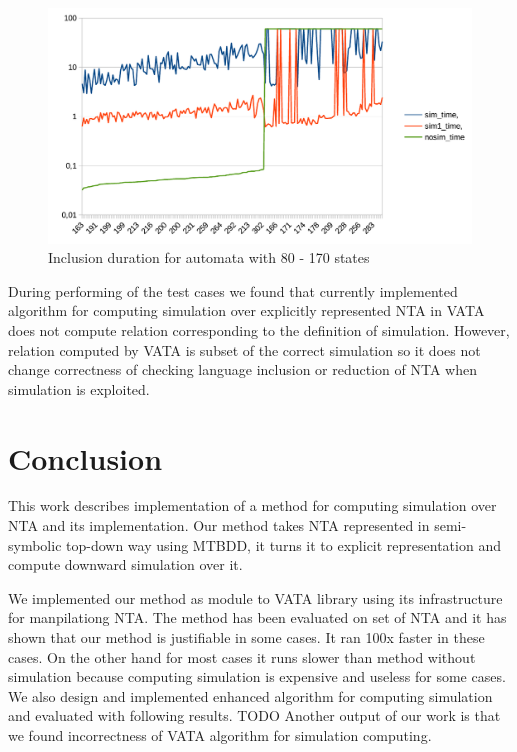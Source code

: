 \documentclass[a4paper, 12pt]{article}
\begin{document}
\begin{figure}[h!]
	\centering
	\includegraphics{g2_advanced}
	\caption{Inclusion duration for automata with 80 - 170 states}
	\label{fig:g_advanced}
\end{figure}

During performing of the test cases we found that currently implemented algorithm for computing simulation over explicitly represented NTA in VATA does not compute relation corresponding to the definition of simulation.
However, relation computed by VATA is subset of the correct simulation so it does not change correctness of checking language inclusion or reduction of NTA when simulation is exploited.

\section{Conclusion}
\label{sec:end}

This work describes implementation of a method for computing simulation over NTA and its implementation.
Our method takes NTA represented in semi-symbolic top-down way using MTBDD, it
turns it to explicit representation and compute downward simulation over it.

We implemented our method as module to VATA library using its infrastructure for manpilationg NTA.
The method has been evaluated on set of NTA and it has shown that our method is justifiable in some cases.
It ran 100x faster in these cases. On the other hand for most cases it runs slower than method without simulation because computing simulation is expensive and useless for some cases.
We also design and implemented enhanced algorithm for computing simulation and evaluated with following results. TODO
Another output of our work is that we found incorrectness of VATA algorithm for simulation computing.
\end{document}
